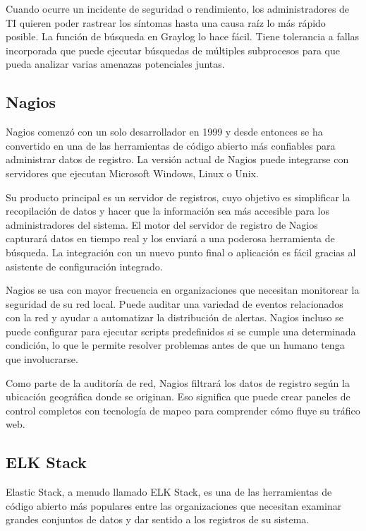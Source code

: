 Cuando ocurre un incidente de seguridad o rendimiento, los administradores de TI quieren poder rastrear los síntomas hasta una causa raíz lo más rápido posible. La función de búsqueda en Graylog lo hace fácil. Tiene tolerancia a fallas incorporada que puede ejecutar búsquedas de múltiples subprocesos para que pueda analizar varias amenazas potenciales juntas.

\subsection{Nagios}

Nagios comenzó con un solo desarrollador en 1999 y desde entonces se ha convertido en una de las herramientas de código abierto más confiables para administrar datos de registro. La versión actual de Nagios puede integrarse con servidores que ejecutan Microsoft Windows, Linux o Unix.

Su producto principal es un servidor de registros, cuyo objetivo es simplificar la recopilación de datos y hacer que la información sea más accesible para los administradores del sistema. El motor del servidor de registro de Nagios capturará datos en tiempo real y los enviará a una poderosa herramienta de búsqueda. La integración con un nuevo punto final o aplicación es fácil gracias al asistente de configuración integrado.

Nagios se usa con mayor frecuencia en organizaciones que necesitan monitorear la seguridad de su red local. Puede auditar una variedad de eventos relacionados con la red y ayudar a automatizar la distribución de alertas. Nagios incluso se puede configurar para ejecutar scripts predefinidos si se cumple una determinada condición, lo que le permite resolver problemas antes de que un humano tenga que involucrarse.

Como parte de la auditoría de red, Nagios filtrará los datos de registro según la ubicación geográfica donde se originan. Eso significa que puede crear paneles de control completos con tecnología de mapeo para comprender cómo fluye su tráfico web.

\subsection{ELK Stack}

Elastic Stack, a menudo llamado ELK Stack, es una de las herramientas de código abierto más populares entre las organizaciones que necesitan examinar grandes conjuntos de datos y dar sentido a los registros de su sistema.

